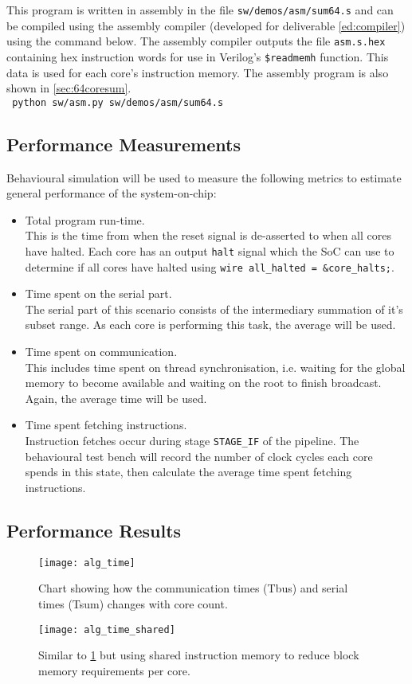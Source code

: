 This program is written in assembly in the file \verb|sw/demos/asm/sum64.s| and can be compiled using the assembly compiler (developed for deliverable \ref{ed:compiler}) using the command below. The assembly compiler outputs the file \verb|asm.s.hex| containing hex instruction words for use in Verilog's \verb|$readmemh| function. This data is used for each core's instruction memory. The assembly program is also shown in \cref{sec:64coresum}.
\\
\texttt{                      python sw/asm.py sw/demos/asm/sum64.s}

\subsection{Performance Measurements}
Behavioural simulation will be used to measure the following metrics to estimate general performance of the system-on-chip:
\begin{itemize}
\item Total program run-time.\\This is the time from when the reset signal is de-asserted to when all cores have halted. Each core has an output \verb|halt| signal which the SoC can use to determine if all cores have halted using \verb|wire all_halted = &core_halts;|. 

\item Time spent on the serial part.\\The serial part of this scenario consists of the intermediary summation of it's subset range. As each core is performing this task, the average will be used.

\item Time spent on communication.\\This includes time spent on thread synchronisation, i.e. waiting for the global memory to become available and waiting on the root to finish broadcast. Again, the average time will be used.

\item Time spent fetching instructions.\\Instruction fetches occur during stage \verb|STAGE_IF| of the pipeline. The behavioural test bench will record the number of clock cycles each core spends in this state, then calculate the average time spent fetching instructions. 
\end{itemize}

\subsection{Performance Results}
\begin{figure}[h]
\centering
\texttt{[image: alg\_time]}
\caption{Chart showing how the communication times (Tbus) and serial times (Tsum) changes with core count.}
\label{fig:alg_time}
\end{figure}

\begin{figure}[h]
\centering
\texttt{[image: alg\_time\_shared]}
\caption{Similar to \cref{fig:alg_time} but using shared instruction memory to reduce block memory requirements per core.}
\label{fig:alg_time_shared}
\end{figure}















